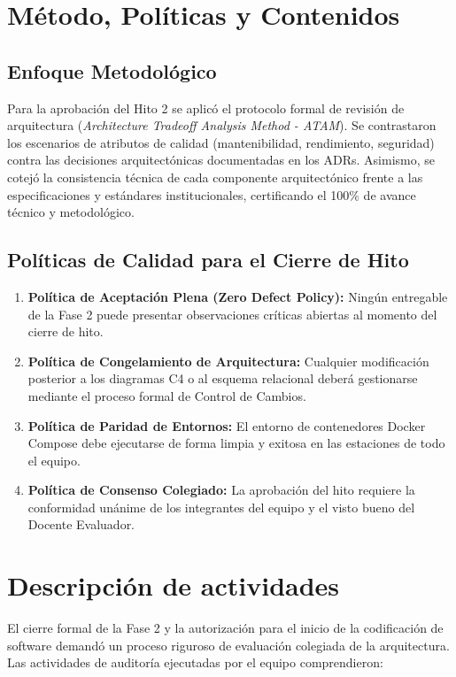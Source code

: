 \documentclass[12pt,a4paper]{article}
\begin{document}
\section{Método, Políticas y Contenidos}
\subsection{Enfoque Metodológico}
Para la aprobación del Hito 2 se aplicó el protocolo formal de revisión de arquitectura (\textit{Architecture Tradeoff Analysis Method - ATAM}). Se contrastaron los escenarios de atributos de calidad (mantenibilidad, rendimiento, seguridad) contra las decisiones arquitectónicas documentadas en los ADRs. Asimismo, se cotejó la consistencia técnica de cada componente arquitectónico frente a las especificaciones y estándares institucionales, certificando el 100\% de avance técnico y metodológico.

\subsection{Políticas de Calidad para el Cierre de Hito}
\begin{enumerate}[leftmargin=1.5em, itemsep=2pt]
    \item \textbf{Política de Aceptación Plena (Zero Defect Policy):} Ningún entregable de la Fase 2 puede presentar observaciones críticas abiertas al momento del cierre de hito.
    \item \textbf{Política de Congelamiento de Arquitectura:} Cualquier modificación posterior a los diagramas C4 o al esquema relacional deberá gestionarse mediante el proceso formal de Control de Cambios.
    \item \textbf{Política de Paridad de Entornos:} El entorno de contenedores Docker Compose debe ejecutarse de forma limpia y exitosa en las estaciones de todo el equipo.
    \item \textbf{Política de Consenso Colegiado:} La aprobación del hito requiere la conformidad unánime de los integrantes del equipo y el visto bueno del Docente Evaluador.
\end{enumerate}

\section{Descripción de actividades}
El cierre formal de la Fase 2 y la autorización para el inicio de la codificación de software demandó un proceso riguroso de evaluación colegiada de la arquitectura. Las actividades de auditoría ejecutadas por el equipo comprendieron:
\end{document}
